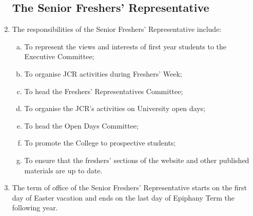 \documentclass[12pt]{article}
\begin{document}
\begin{enumerate}
    \subsection{The Senior Freshers' Representative}
    \item The responsibilities of the Senior Freshers' Representative include:
    \begin{enumerate}[(a)]
        \item To represent the views and interests of first year students to the Executive Committee;
        \item To organise JCR activities during Freshers' Week;
        \item To head the Freshers' Representatives Committee;
        \item To organise the JCR's activities on University open days;
        \item To head the Open Days Committee;
        \item To promote the College to prospective students;
        \item To ensure that the freshers' sections of the website and other published materials are up to date.
    \end{enumerate}
    \item The term of office of the Senior Freshers' Representative starts on the first day of Easter vacation and ends on the last day of Epiphany Term the following year.

\end{enumerate}
\end{document}
